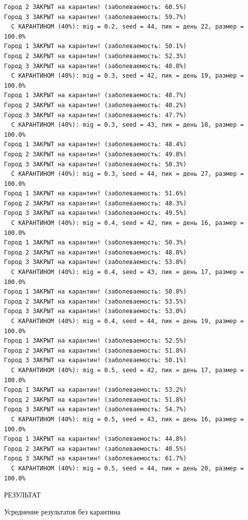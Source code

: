 \documentclass[
  12pt,
  a4paper,
  DIV=11,
  numbers=noendperiod]{scrreprt}
\begin{document}
\begin{verbatim}
Город 2 ЗАКРЫТ на карантин! (заболеваемость: 60.5%)
Город 3 ЗАКРЫТ на карантин! (заболеваемость: 59.7%)
  С КАРАНТИНОМ (40%): mig = 0.2, seed = 44, пик = день 22, размер = 100.0%
Город 1 ЗАКРЫТ на карантин! (заболеваемость: 50.1%)
Город 2 ЗАКРЫТ на карантин! (заболеваемость: 52.3%)
Город 3 ЗАКРЫТ на карантин! (заболеваемость: 48.8%)
  С КАРАНТИНОМ (40%): mig = 0.3, seed = 42, пик = день 19, размер = 100.0%
Город 1 ЗАКРЫТ на карантин! (заболеваемость: 48.7%)
Город 2 ЗАКРЫТ на карантин! (заболеваемость: 40.2%)
Город 3 ЗАКРЫТ на карантин! (заболеваемость: 47.7%)
  С КАРАНТИНОМ (40%): mig = 0.3, seed = 43, пик = день 18, размер = 100.0%
Город 1 ЗАКРЫТ на карантин! (заболеваемость: 48.4%)
Город 2 ЗАКРЫТ на карантин! (заболеваемость: 49.8%)
Город 3 ЗАКРЫТ на карантин! (заболеваемость: 50.3%)
  С КАРАНТИНОМ (40%): mig = 0.3, seed = 44, пик = день 27, размер = 100.0%
Город 1 ЗАКРЫТ на карантин! (заболеваемость: 51.6%)
Город 2 ЗАКРЫТ на карантин! (заболеваемость: 48.3%)
Город 3 ЗАКРЫТ на карантин! (заболеваемость: 49.5%)
  С КАРАНТИНОМ (40%): mig = 0.4, seed = 42, пик = день 16, размер = 100.0%
Город 1 ЗАКРЫТ на карантин! (заболеваемость: 50.3%)
Город 2 ЗАКРЫТ на карантин! (заболеваемость: 48.8%)
Город 3 ЗАКРЫТ на карантин! (заболеваемость: 53.8%)
  С КАРАНТИНОМ (40%): mig = 0.4, seed = 43, пик = день 17, размер = 100.0%
Город 1 ЗАКРЫТ на карантин! (заболеваемость: 50.8%)
Город 2 ЗАКРЫТ на карантин! (заболеваемость: 53.5%)
Город 3 ЗАКРЫТ на карантин! (заболеваемость: 53.0%)
  С КАРАНТИНОМ (40%): mig = 0.4, seed = 44, пик = день 19, размер = 100.0%
Город 1 ЗАКРЫТ на карантин! (заболеваемость: 52.5%)
Город 2 ЗАКРЫТ на карантин! (заболеваемость: 51.8%)
Город 3 ЗАКРЫТ на карантин! (заболеваемость: 50.1%)
  С КАРАНТИНОМ (40%): mig = 0.5, seed = 42, пик = день 17, размер = 100.0%
Город 1 ЗАКРЫТ на карантин! (заболеваемость: 53.2%)
Город 2 ЗАКРЫТ на карантин! (заболеваемость: 51.8%)
Город 3 ЗАКРЫТ на карантин! (заболеваемость: 54.7%)
  С КАРАНТИНОМ (40%): mig = 0.5, seed = 43, пик = день 16, размер = 100.0%
Город 1 ЗАКРЫТ на карантин! (заболеваемость: 44.8%)
Город 2 ЗАКРЫТ на карантин! (заболеваемость: 40.5%)
Город 3 ЗАКРЫТ на карантин! (заболеваемость: 61.7%)
  С КАРАНТИНОМ (40%): mig = 0.5, seed = 44, пик = день 20, размер = 100.0%
\end{verbatim}

РЕЗУЛЬТАТ

Усреднение результатов без карантина
\end{document}
